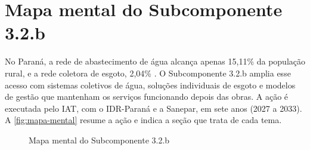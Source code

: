 \section{Mapa mental do Subcomponente 3.2.b}
\label{sec:mapa-mental}

No Paraná, a rede de abastecimento de água alcança apenas 15,11\% da população
rural, e a rede coletora de esgoto, 2,04\% \cite{sinisa2024}. O Subcomponente
3.2.b amplia esse acesso com sistemas coletivos de água, soluções individuais
de esgoto e modelos de gestão que mantenham os serviços funcionando depois das
obras. A ação é executada pelo IAT, com o IDR-Paraná e a Sanepar, em sete anos
(2027 a 2033). A \autoref{fig:mapa-mental} resume a ação e indica a seção que
trata de cada tema.

\begin{figure}[htbp]
  \centering
  \caption{Mapa mental do Subcomponente 3.2.b}
  \label{fig:mapa-mental}
\end{figure}
